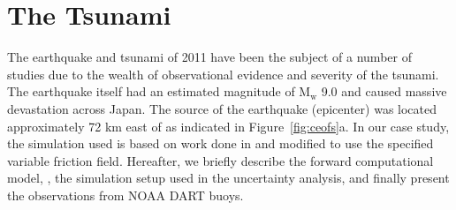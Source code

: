 
\section{The \tohoku Tsunami} 
\label{sec:tohoku}

The \tohoku earthquake and tsunami of 2011 have been the subject of a number of
studies due to the wealth of observational evidence and severity of the tsunami.
The earthquake itself had an estimated magnitude of $\text{M}_\text{w}$ 9.0 and
caused massive devastation across Japan. The source of the earthquake (epicenter)
was located approximately 72 km east of \tohoku as indicated 
in Figure~\ref{fig:ceofs}a. In our case study, the
simulation used is based on work done in \cite{MacInnes:2013cr} and modified to 
use the specified variable friction field. Hereafter, we briefly describe the
forward computational model, \geoclaw, the  simulation setup used in the
uncertainty analysis, and finally present the observations from NOAA DART buoys.



